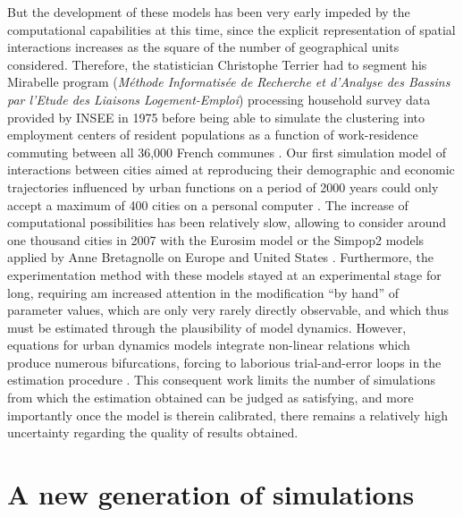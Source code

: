 \documentclass[10pt]{article}
\begin{document}
But the development of these models has been very early impeded by the computational capabilities at this time, since the explicit representation of spatial interactions increases as the square of the number of geographical units considered. Therefore, the statistician Christophe Terrier had to segment his Mirabelle program (\textit{Méthode Informatisée de Recherche et d'Analyse des Bassins par l'Etude des Liaisons Logement-Emploi}) processing household survey data provided by INSEE in 1975 before being able to simulate the clustering into employment centers of resident populations as a function of work-residence commuting between all 36,000 French communes \citep{}. Our first simulation model of interactions between cities aimed at reproducing their demographic and economic trajectories influenced by urban functions on a period of 2000 years could only accept a maximum of 400 cities on a personal computer \citep{}. The increase of computational possibilities has been relatively slow, allowing to consider around one thousand cities in 2007 with the Eurosim model \citep{} or the Simpop2 models applied by Anne Bretagnolle on Europe and United States \citep{bretagnolle2010simulating}. Furthermore, the experimentation method with these models stayed at an experimental stage for long, requiring am increased attention in the modification ``by hand'' of parameter values, which are only very rarely directly observable, and which thus must be estimated through the plausibility of model dynamics. However, equations for urban dynamics models integrate non-linear relations which produce numerous bifurcations, forcing to laborious trial-and-error loops in the estimation procedure \citep{}. This consequent work limits the number of simulations from which the estimation obtained can be judged as satisfying, and more importantly once the model is therein calibrated, there remains a relatively high uncertainty regarding the quality of results obtained.


\section{A new generation of simulations}
\end{document}
